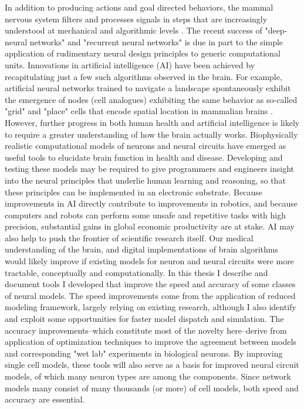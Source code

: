 In addition to producing actions and goal directed behaviors, the mammal nervous system filters and processes signals in steps that are increasingly understood at mechanical and algorithmic levels \cite{marr1976understanding}. The recent success of "deep-neural networks" and "recurrent neural networks" is due in part to the simple application of rudimentary neural design principles to generic computational units.  Innovations in artificial intelligence (AI) have been achieved by recapitulating just a few such algorithms observed in the brain. For example, artificial neural networks trained to navigate a landscape spontaneously exhibit the emergence of nodes (cell analogues) exhibiting the same behavior as so-called "grid" and "place" cells that encode spatial location in mammalian brains  \cite{banino2018vector}.  However, further progress in both human health and artificial intelligence is likely to require a greater understanding of how the brain actually works.  Biophysically realistic computational models of neurons and neural circuits have emerged as useful tools to elucidate brain function in health and disease.  Developing and testing these models may be required to give programmers and engineers insight into the neural principles that underlie human learning and reasoning, so that these principles can be implemented in an electronic substrate. Because improvements in AI directly contribute to improvements in robotics, and because computers and robots can perform some unsafe and repetitive tasks with high precision, substantial gains in global economic productivity are at stake.  AI may also help to push the frontier of scientific research itself.
Our medical understanding of the brain, and digital implementations of brain algorithms would likely improve if existing models for neuron and neural circuits were more tractable, conceptually and computationally.  In this thesis I describe and document tools I developed that improve the speed and accuracy of some classes of neural models.  The speed improvements come from the application of reduced modeling framework, largely relying on existing research, although I also identify and exploit some opportunities for faster model dispatch and simulation.  The accuracy improvements--which constitute most of the novelty here--derive from application of optimization techniques to improve the agreement between models and corresponding "wet lab" experiments in biological neurons. By improving single cell models, these tools will also serve as a basis for improved neural circuit models, of which many neuron types are among the components.  Since network models many consist of many thousands (or more) of cell models, both speed and accuracy are essential.
